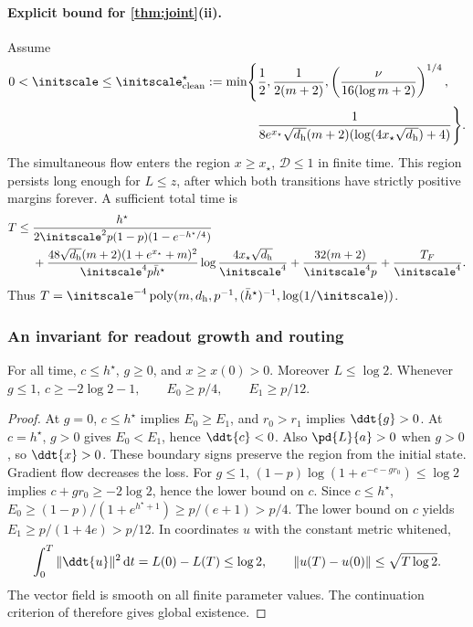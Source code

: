 \paragraph{Explicit bound for \cref{thm:joint}(ii).}
Assume
\begin{equation}
 \begin{aligned}
 0<\initscale\le\initscale^\star_{\mathrm{clean}}:=\min\Biggl\{&\frac12,\frac1{2(m+2)},
 \left(\frac{\nu}{16(\log m+2)}\right)^{1/4},\\
 &\frac1{8e^{x_\star}\sqrt{d_{\mathrm h}}(m+2)(\log(4x_\star\sqrt{d_{\mathrm h}})+4)}\Biggr\}.
 \end{aligned}
 \label{eq:CR-scale}
\end{equation}
The simultaneous flow enters the region $x\ge x_\star$, $\mathcal D\le1$ in finite time. This region persists long enough for $L\le z$, after which both transitions have strictly positive margins forever. A sufficient total time is
\begin{align}
 T\le{}&\frac{h^\star}{2\initscale^2 p(1-p)(1-e^{-h^\star/4})}\notag\\
 &+\frac{48\sqrt{d_{\mathrm h}}(m+2)(1+e^{x_\star}+m)^2}{\initscale^4p\bar h^\star}
       \log\frac{4x_\star\sqrt{d_{\mathrm h}}}{\initscale^4}
 +\frac{32(m+2)}{\initscale^4p}+\frac{T_F}{\initscale^4}.\label{eq:CR-time}
\end{align}
Thus $T=\initscale^{-4}\operatorname{poly}(m,d_{\mathrm h},p^{-1},(\bar h^\star)^{-1},\log(1/\initscale))$.

\subsubsection{An invariant for readout growth and routing}
\begin{lemma}
\label{lem:CR-align}
For all time, $c\le h^\star$, $g\ge0$, and $x\ge x(0)>0$. Moreover $L\le\log2$. Whenever $g\le1$,
 $c\ge-2\log2-1,\qquad E_0\ge p/4,\qquad E_1\ge p/12.$ 
\end{lemma}
\begin{proof}
At $g=0$, $c\le h^\star$ implies $E_0\ge E_1$, and $r_0>r_1$ implies $\ddt{g}>0$.
At $c=h^\star$, $g>0$ gives $E_0<E_1$, hence $\ddt{c}<0$. Also $\pd{L}{a}>0$ when $g>0$, so $\ddt{x}>0$.
These boundary signs preserve the region from the initial state. Gradient flow decreases the loss.
For $g\le1$, $(1-p)\log(1+e^{-c-gr_0})\le\log2$ implies $c+gr_0\ge-2\log2$, hence the lower bound on $c$.
Since $c\le h^\star$,
$E_0\ge(1-p)/(1+e^{h^\star+1})\ge p/(e+1)>p/4$.
The lower bound on $c$ yields $E_1\ge p/(1+4e)>p/12$.
In coordinates $u$ with the constant metric whitened,
\[
 \int_0^T\|\ddt{u}\|^2\,\mathrm d t=L(0)-L(T)\le\log2,\qquad
 \|u(T)-u(0)\|\le\sqrt{T\log2}.
\]
The vector field is smooth on all finite parameter values. The continuation criterion of \citet[Corollary~2.15]{teschl2012ode} therefore gives global existence.
\end{proof}

